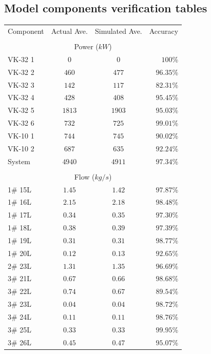 \begin{appendices}
\chapter{Model components verification tables}
\newpage
\begin{table}[h!]
	\centering
	\begin{tabular}{lccr}
		\hline 
		Component & Actual Ave. & Simulated  Ave. & Accuracy \\ \hhline{====} 
		\\
		\multicolumn{4}{c}{Power ($ kW $)}
		\\
		VK-32 1 & $  0  $ & $  0  $ & $ 100   $\% \\
		VK-32 2 & $ 460 $ & $ 477 $ & $ 96.35 $\% \\
		VK-32 3 & $ 142 $ & $ 117 $ & $ 82.31 $\% \\
		VK-32 4 & $ 428 $ & $ 408 $ & $ 95.45 $\% \\
		VK-32 5 & $ 1813$ & $ 1903$ & $ 95.03 $\% \\
		VK-32 6 & $ 732 $ & $ 725 $ & $ 99.01 $\% \\
		VK-10 1 & $ 744 $ & $ 745 $ & $ 90.02 $\% \\
		VK-10 2 & $ 687 $ & $ 635 $ & $ 92.24 $\% \\
		System  & $ 4940$ & $4911 $ & $ 97.34 $\% \\
		\\
		\multicolumn{4}{c}{Flow ($ kg/s $)}
		\\
		1\# 15L  & $ 1.45 $ & $ 1.42 $ & $ 97.87 $\% \\
		1\# 16L  & $ 2.15 $ & $ 2.18 $ & $ 98.48 $\% \\
		1\# 17L  & $ 0.34 $ & $ 0.35 $ & $ 97.30 $\% \\
		1\# 18L  & $ 0.38 $ & $ 0.39 $ & $ 97.39 $\% \\
		1\# 19L  & $ 0.31 $ & $ 0.31 $ & $ 98.77 $\% \\
		1\# 20L  & $ 0.12 $ & $ 0.13 $ & $ 92.65 $\% \\
		2\# 23L  & $ 1.31 $ & $ 1.35 $ & $ 96.69 $\% \\
		3\# 21L  & $ 0.67 $ & $ 0.66 $ & $ 98.68 $\% \\
		3\# 22L  & $ 0.74 $ & $ 0.67 $ & $ 89.54 $\% \\
		3\# 23L  & $ 0.04 $ & $ 0.04 $ & $ 98.72 $\% \\
		3\# 24L  & $ 0.11 $ & $ 0.11 $ & $ 98.76 $\% \\
		3\# 25L  & $ 0.33 $ & $ 0.33 $ & $ 99.95 $\% \\
		3\# 26L  & $ 0.45 $ & $ 0.47 $ & $ 95.07 $\% \\

\end{tabular}
\end{table}
\end{appendices}
